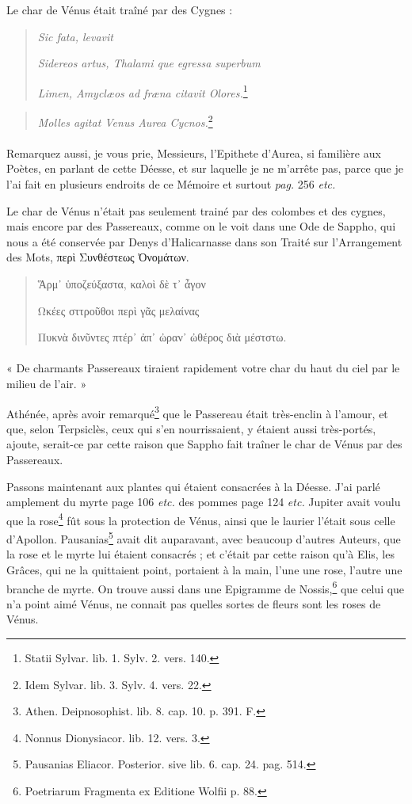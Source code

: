 \documentclass[a4paper, 18pt, oneside]{article}
\begin{document}
Le char de Vénus était traîné par des Cygnes :
\begin{quotation}
\hspace*{15mm}\emph{Sic fata, levavit}

\emph{Sidereos artus, Thalami que egressa superbum}

\emph{Limen, Amyclæos ad fræna citavit Olores.}\footnote{Statii Sylvar. lib. 1. Sylv. 2. vers. 140.}
\end{quotation}
\begin{quotation}
\emph{Molles agitat Venus Aurea Cycnos.}\footnote{Idem Sylvar. lib. 3. Sylv. 4. vers. 22.}
\end{quotation}
\paragraph{}
Remarquez aussi, je vous prie, Messieurs, l'Epithete d'Aurea, si familière aux Poètes, en parlant de cette Déesse, et sur laquelle je ne m'arrête pas, parce que je l'ai fait en plusieurs endroits de ce Mémoire et surtout \emph{pag.} 256 \emph{etc.}

Le char de Vénus n'était pas seulement trainé par des colombes et des cygnes, mais encore par des Passereaux, comme on le voit dans une Ode de Sappho, qui nous a été conservée par Denys d'Halicarnasse dans son Traité sur l'Arrangement des Mots, περὶ Συνθέστεως Ὀνομάτων.
\begin{quotation}
Ἅρμ᾽ ὑποζεύξαστα, καλοὶ δὲ τ᾽ ἆγον

Ωκέες σττροῦθοι περὶ γᾶς μελαίνας

Πυκνὰ δινῦντες πτέρ᾽ ἀπ᾿ ὠραν᾽ ὠθέρος διὰ μέστστω.
\end{quotation}
\paragraph{}
« De charmants Passereaux tiraient rapidement votre char du haut du ciel par le milieu de l'air. »

Athénée, après avoir remarqué\footnote{Athen. Deipnosophist. lib. 8. cap. 10. p. 391. F.} que le Passereau était très-enclin à l'amour, et que, selon Terpsiclès, ceux qui s'en nourrissaient, y étaient aussi très-portés, ajoute, serait-ce par cette raison que Sappho fait traîner le char de Vénus par des Passereaux.

Passons maintenant aux plantes qui étaient consacrées à la Déesse. J'ai parlé amplement du myrte page 106 \emph{etc.} des pommes page 124 \emph{etc.} Jupiter avait voulu que la rose\footnote{Nonnus Dionysiacor. lib. 12. vers. 3.} fût sous la protection de Vénus, ainsi que le laurier l'était sous celle d'Apollon. Pausanias\footnote{Pausanias Eliacor. Posterior. sive lib. 6. cap. 24. pag. 514.} avait dit auparavant, avec beaucoup d'autres Auteurs, que la rose et le myrte lui étaient consacrés ; et c'était par cette raison qu'à Elis, les Grâces, qui ne la quittaient point, portaient à la main, l'une une rose, l'autre une branche de myrte. On trouve aussi dans une Epigramme de Nossis,\footnote{Poetriarum Fragmenta ex Editione Wolfii p. 88.} que celui que n'a point aimé Vénus, ne connait pas quelles sortes de fleurs sont les roses de Vénus.
\end{document}
